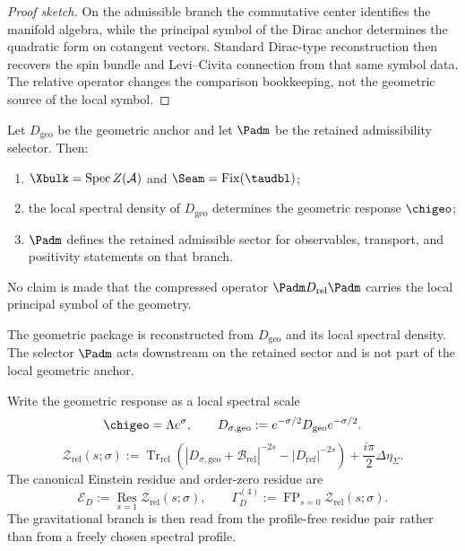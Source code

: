 \begin{proof}[Proof sketch]
On the admissible branch the commutative center identifies the manifold algebra, while the
principal symbol of the Dirac anchor determines the quadratic form on cotangent vectors.
Standard Dirac-type reconstruction then recovers the spin bundle and Levi--Civita connection
from that same symbol data. The relative operator changes the comparison bookkeeping, not the
geometric source of the local symbol.
\end{proof}

\begin{theorem}
\label{thm:retained-branch-from-Padm}
\label{thm:admissible-sector-on-reconstructed-geometry}
\label{thm:full-operator-reconstruction}
Let $D_{\mathrm{geo}}$ be the geometric anchor and let $\Padm$ be the retained
admissibility selector.
Then:
\begin{enumerate}[label=(\roman*), leftmargin=1.5em, topsep=3pt, itemsep=2pt]
\item $\Xbulk=\mathrm{Spec}\,Z(\mathcal A)$ and $\Seam=\mathrm{Fix}(\taudbl)$;
\item the local spectral density of $D_{\mathrm{geo}}$ determines the geometric response
      $\chigeo$;
\item $\Padm$ defines the retained admissible sector for observables, transport,
      and positivity statements on that branch.
\end{enumerate}
No claim is made that the compressed operator $\Padm D_{\mathrm{rel}}\Padm$
carries the local principal symbol of the geometry.
\end{theorem}

\begin{corollary}
The geometric package is reconstructed from $D_{\mathrm{geo}}$ and its local spectral density.
The selector $\Padm$ acts downstream on the retained sector and is not part of the
local geometric anchor.
\end{corollary}

\begin{definition}
\label{def:local-spectral-scale}
\label{def:canonical-residues}
Write the geometric response as a local spectral scale
\[
\chigeo=\Lambda e^\sigma,
\qquad
D_{\sigma,\mathrm{geo}}:=e^{-\sigma/2}D_{\mathrm{geo}}e^{-\sigma/2}.
\]
\[
\mathcal Z_{\mathrm{rel}}(s;\sigma)
:=
\operatorname{Tr}_{\mathrm{rel}}\!\left(
|D_{\sigma,\mathrm{geo}}+\mathcal B_{\mathrm{rel}}|^{-2s}
-|D_{\mathrm{ref}}|^{-2s}
\right)
+\frac{i\pi}{2}\Delta\eta_\Sigma.
\]
The canonical Einstein residue and order-zero residue are
\[
\mathcal E_D
:=
\operatorname*{Res}_{s=1}\mathcal Z_{\mathrm{rel}}(s;\sigma),
\qquad
\Gamma_D^{(4)}
:=
\operatorname{FP}_{s=0}\mathcal Z_{\mathrm{rel}}(s;\sigma).
\]
The gravitational branch is then read from the profile-free residue pair rather than from a freely
chosen spectral profile.
\end{definition}

